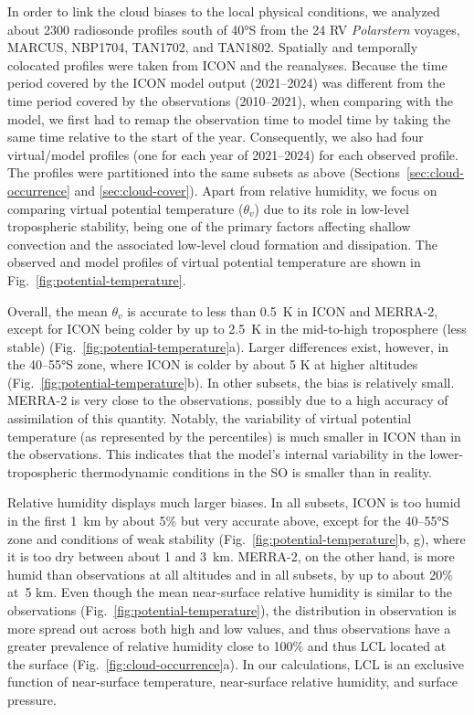 \documentclass[draft]{agujournal2019}
\begin{document}
In order to link the cloud biases to the local physical conditions, we analyzed about 2300 radiosonde profiles south of 40°S from the 24 RV \emph{Polarstern} voyages, MARCUS, NBP1704, TAN1702, and TAN1802. Spatially and temporally colocated profiles were taken from ICON and the reanalyses. Because the time period covered by the ICON model output (2021--2024) was different from the time period covered by the observations (2010--2021), when comparing with the model, we first had to remap the observation time to model time by taking the same time relative to the start of the year. Consequently, we also had four virtual/model profiles (one for each year of 2021--2024) for each observed profile. The profiles were partitioned into the same subsets as above (Sections~\ref{sec:cloud-occurrence} and \ref{sec:cloud-cover}). Apart from relative humidity, we focus on comparing virtual potential temperature ($\theta_v$) due to its role in low-level tropospheric stability, being one of the primary factors affecting shallow convection and the associated low-level cloud formation and dissipation. The observed and model profiles of virtual potential temperature are shown in Fig.~\ref{fig:potential-temperature}.

Overall, the mean $\theta_v$ is accurate to less than 0.5~K in ICON and MERRA-2, except for ICON being colder by up to 2.5~K in the mid-to-high troposphere (less stable) (Fig.~\ref{fig:potential-temperature}a). Larger differences exist, however, in the 40--55°S zone, where ICON is colder by about 5 K at higher altitudes (Fig.~\ref{fig:potential-temperature}b). In other subsets, the bias is relatively small. MERRA-2 is very close to the observations, possibly due to a high accuracy of assimilation of this quantity. Notably, the variability of virtual potential temperature (as represented by the percentiles) is much smaller in ICON than in the observations. This indicates that the model's internal variability in the lower-tropospheric thermodynamic conditions in the SO is smaller than in reality.

Relative humidity displays much larger biases. In all subsets, ICON is too humid in the first 1~km by about 5\% but very accurate above, except for the 40--55°S zone and conditions of weak stability (Fig.~\ref{fig:potential-temperature}b, g), where it is too dry between about 1 and 3~km. MERRA-2, on the other hand, is more humid than observations at all altitudes and in all subsets, by up to about 20\% at~5 km. Even though the mean near-surface relative humidity is similar to the observations (Fig.~\ref{fig:potential-temperature}), the distribution in observation is more spread out across both high and low values, and thus observations have a greater prevalence of relative humidity close to 100\% and thus LCL located at the surface (Fig.~\ref{fig:cloud-occurrence}a). In our calculations, LCL is an exclusive function of near-surface temperature, near-surface relative humidity, and surface pressure.
\end{document}

